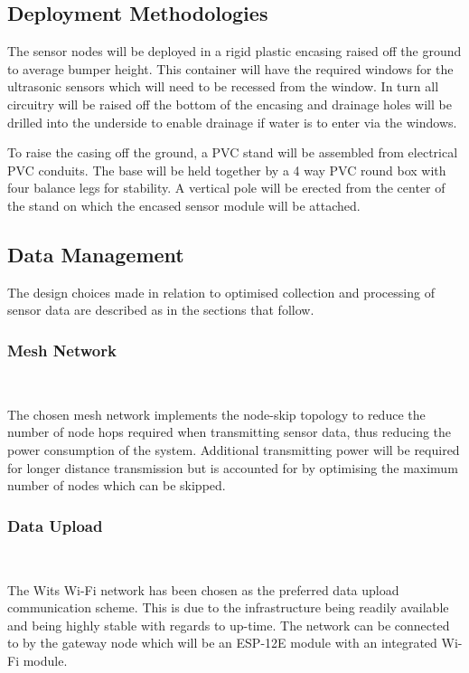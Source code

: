 \documentclass[10pt,twocolumn]{witseiepaper}
\begin{document}
	\subsection{Deployment Methodologies}
	
		The sensor nodes will be deployed in a rigid plastic encasing raised off the ground to average bumper height. This container will have the required windows for the ultrasonic sensors which will need to be recessed from the window. In turn all circuitry will be raised off the bottom of the encasing and drainage holes will be drilled into the underside to enable drainage if water is to enter via the windows.
		
		To raise the casing off the ground, a PVC stand will be assembled from electrical PVC conduits. The base will be held together by a 4 way PVC round box with four balance legs for stability. A vertical pole will be erected from the center of the stand on which the encased sensor module will be attached.
	
	\subsection{Data Management}
		The design choices made in relation to optimised collection and processing of sensor data are described as in the sections that follow.
	
	\subsubsection{Mesh Network} $   $
	
		The chosen mesh network implements the node-skip topology to reduce the number of node hops required when transmitting sensor data, thus reducing the power consumption of the system. Additional transmitting power will be required for longer distance transmission but is accounted for by optimising the maximum number of nodes which can be skipped.
	
	\subsubsection{Data Upload} $   $
	
		The Wits Wi-Fi network has been chosen as the preferred data upload communication scheme. This is due to the infrastructure being readily available and being highly stable with regards to up-time. The network can be connected to by the gateway node which will be an ESP-12E module with an integrated Wi-Fi module.
		
\end{document}
